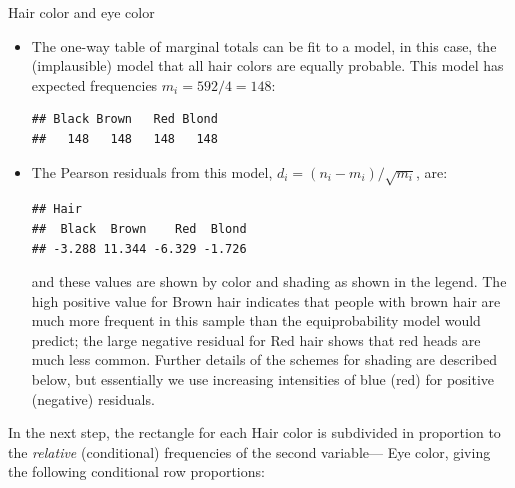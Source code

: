 \documentclass[11pt]{book}
\renewenvironment{knitrout}{\small\renewcommand{\baselinestretch}{.85}}{} %
\begin{document}
\begin{Example}[haireye2a]{Hair color and eye color}
\begin{itemize}
\item The one-way table of marginal totals can be fit to a model, in this
case, the (implausible) model that all hair colors are equally probable.  This model
has expected frequencies $m_i = 592/4 = 148$:
\begin{knitrout}
\color{fgcolor}\begin{kframe}
\begin{alltt}
 \hlkwb{<-} \hlstd{(}\hlopt{/}\hlstd{,} \hlstd{)}
 \hlkwb{<-} 
\end{alltt}
\begin{verbatim}
## Black Brown   Red Blond 
##   148   148   148   148
\end{verbatim}
\end{kframe}
\end{knitrout}
\item The Pearson residuals from this model, $d_i = ( n_i - m_i ) / \sqrt{m_i}$, are:
\begin{knitrout}
\color{fgcolor}\begin{kframe}
\begin{alltt}
 \hlkwb{<-}  \hlopt{-}  \hlopt{/} 
\end{alltt}
\begin{verbatim}
## Hair
##  Black  Brown    Red  Blond 
## -3.288 11.344 -6.329 -1.726
\end{verbatim}
\end{kframe}
\end{knitrout}
and these values are shown by color and shading as shown in the legend.
The high positive value for Brown hair indicates that people
with brown hair are much more frequent in this sample than 
the equiprobability model would predict; the large negative residual
for Red hair shows that red heads are much less common.  Further details
of the schemes for shading are described below, but essentially we use
increasing intensities of blue (red) for positive (negative) residuals.
\end{itemize}

In the next step, the rectangle for each Hair color is subdivided in proportion
to the \emph{relative} (conditional) frequencies of the second variable---
Eye color, giving the following conditional row proportions:


\end{Example}
\end{document}
